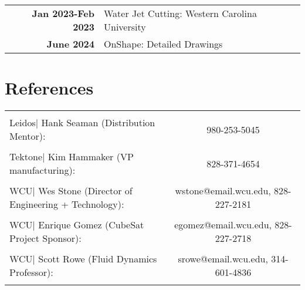 \documentclass[allblack]{simplehipstercv}
\begin{document}
\begin{paracol}{2}
\begin{tabular}{>{\footnotesize\bfseries}r p{}}
    Jan 2023-Feb 2023 & Water Jet Cutting: Western Carolina University \\

    June 2024 & OnShape: Detailed Drawings \\
\end{tabular}

\section*{References}
\begin{tabular}{l c}
    \hline & \\[0.5mm]
    Leidos| Hank Seaman (Distribution Mentor): & 980-253-5045\\[8pt]
    \hline & \\[0.5mm]
    Tektone| Kim Hammaker (VP manufacturing): & 828-371-4654\\[8pt]
    \hline & \\[0.5mm]
    WCU| Wes Stone (Director of Engineering + Technology): & wstone@email.wcu.edu, 828-227-2181\\[8pt]
    \hline & \\[0.5mm]
    WCU| Enrique Gomez (CubeSat Project Sponsor): & egomez@email.wcu.edu, 828-227-2718\\[8pt]
    \hline & \\[0.5mm]
    WCU| Scott Rowe (Fluid Dynamics Professor): & srowe@email.wcu.edu, 314-601-4836\\[8pt]
    \hline & \\[0.5mm]
\end{tabular}

\bigskip
\newpage

\end{paracol}
\end{document}
